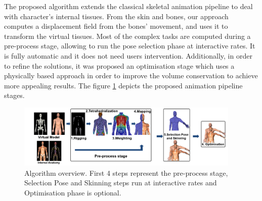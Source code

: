 
The proposed algorithm extends the classical skeletal animation pipeline to deal with character's internal tissues. From the skin and bones, our approach computes a displacement field from the bones’ movement, and uses it to transform the virtual tissues. Most of the complex tasks are computed during a pre-process stage, allowing to run the pose selection phase at interactive rates. It is fully automatic and it does not need users intervention.  Additionally, in order to refine the solutions, it was proposed an optimisation stage which uses a physically based approach in order to improve the volume conservation to achieve more appealing results. The figure \ref{fig:summaryarq} depicts the proposed animation pipeline stages. 



\begin{figure}[ht]
    \centering
    \includegraphics[width=0.95\textwidth]{IMG/summaryarq.pdf}
    \caption{Algorithm overview. First 4 steps represent the pre-process stage, Selection Pose and Skinning steps run at interactive rates and Optimisation phase is optional.}
    \label{fig:summaryarq}
\end{figure}

